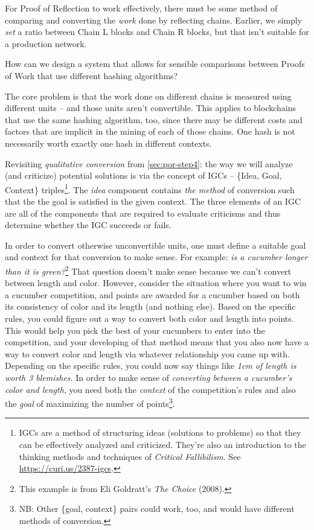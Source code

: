 For Proof of Reflection to work effectively, there must be some method
of comparing and converting the \emph{work} done by reflecting chains.
Earlier, we simply \emph{set} a ratio between Chain L blocks and Chain R
blocks, but that isn't suitable for a production network.

How can we design a system that allows for sensible comparisons between
Proofs of Work that use different hashing algorithms?

The core problem is that the work done on different chains is measured
using different units -- and those units aren't convertible. This
applies to blockchains that use the same hashing algorithm, too, since
there may be different costs and factors that are implicit in the mining
of each of those chains. One hash is not necessarily worth exactly one
hash in different contexts.

Revisiting \emph{qualitative conversion} from \autoref{sec:por-step4}:
the way we will analyze (and criticize) potential solutions is via the
concept of IGCs -- \{Idea, Goal, Context\} triples\footnote{IGCs are a
  method of structuring ideas (solutions to problems) so that they can
  be effectively analyzed and criticized. They're also an introduction
  to the thinking methods and techniques of \emph{Critical Fallibilism}.
  See \url{https://curi.us/2387-igcs}.}. The \emph{idea} component
contains \emph{the method} of conversion such that the the goal is
satisfied in the given context. The three elements of an IGC are all of
the components that are required to evaluate criticisms and thus
determine whether the IGC succeeds or fails.

In order to convert otherwise unconvertible units, one must define a
suitable goal and context for that conversion to make sense. For
example: \emph{is a cucumber longer than it is green?}\footnote{This
  example is from Eli Goldratt's \emph{The Choice} (2008).} That
question doesn't make sense because we can't convert between length and
color. However, consider the situation where you want to win a cucumber
competition, and points are awarded for a cucumber based on both its
consistency of color and its length (and nothing else). Based on the
specific rules, you could figure out a way to convert both color and
length into points. This would help you pick the best of your cucumbers
to enter into the competition, and your developing of that method means
that you also now have a way to convert color and length via whatever
relationship you came up with. Depending on the specific rules, you
could now say things like \emph{1cm of length is worth 3 blemishes}. In
order to make sense of \emph{converting between a cucumber's color and
length}, you need both the \emph{context} of the competition's rules and
also the \emph{goal} of maximizing the number of points\footnote{NB:
  Other \{goal, context\} pairs could work, too, and would have
  different methods of conversion.}.

